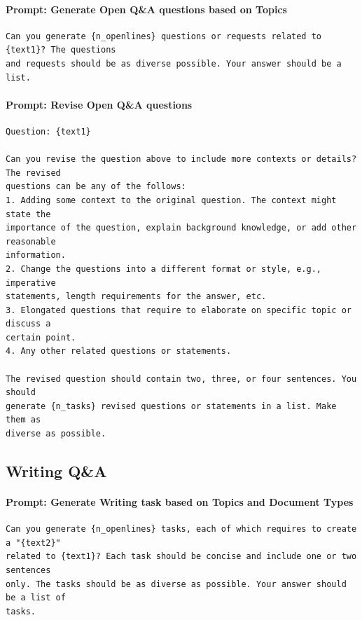 \documentclass[11pt]{article}
\begin{document}
\paragraph{Prompt: Generate Open Q\&A questions based on Topics}
\begin{verbatim}
Can you generate {n_openlines} questions or requests related to {text1}? The questions
and requests should be as diverse possible. Your answer should be a list.
\end{verbatim}

\paragraph{Prompt: Revise Open Q\&A questions}
\begin{verbatim}
Question: {text1}

Can you revise the question above to include more contexts or details? The revised
questions can be any of the follows:
1. Adding some context to the original question. The context might state the 
importance of the question, explain background knowledge, or add other reasonable
information. 
2. Change the questions into a different format or style, e.g., imperative 
statements, length requirements for the answer, etc.
3. Elongated questions that require to elaborate on specific topic or discuss a 
certain point.
4. Any other related questions or statements.

The revised question should contain two, three, or four sentences. You should 
generate {n_tasks} revised questions or statements in a list. Make them as 
diverse as possible.
\end{verbatim}


\subsection{Writing Q\&A}

\paragraph{Prompt: Generate Writing task based on Topics and Document Types}
\begin{verbatim}
Can you generate {n_openlines} tasks, each of which requires to create a "{text2}" 
related to {text1}? Each task should be concise and include one or two sentences 
only. The tasks should be as diverse as possible. Your answer should be a list of 
tasks.
\end{verbatim}
\end{document}
